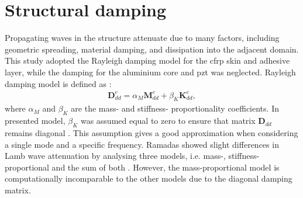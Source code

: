 \section{Structural damping}
\label{sec:damping}

Propagating waves in the structure attenuate due to many factors, including geometric spreading, material damping, and dissipation into the adjacent domain.
This study adopted the Rayleigh damping model for the \ac{cfrp} skin and adhesive layer, while the damping for the aluminium core and \ac{pzt} was neglected.
Rayleigh damping model is defined as \cite{wandowski2017guided}:
\begin{eqnarray}
	\textbf{D}_{dd}^e = \alpha_M \textbf{M}_{dd}^e + \beta_K \textbf{K}_{dd}^e,
	\label{eq:damping}
\end{eqnarray}
where \(\alpha_M\) and \(\beta_K\) are the mass- and stiffness- proportionality coefficients.
In presented model, \(\beta_K\) was assumed equal to zero to ensure that matrix \(\textbf{D}_{dd}\) remains diagonal \cite{schulte2011simulation, wandowski2017guided}.
This assumption gives a good approximation when considering a single mode and a specific frequency. 
Ramadas showed slight differences in Lamb wave attenuation by analysing three models, i.e. mass-, stiffness-proportional and the sum of both \cite{ramadas2011modelling}.
However, the mass-proportional model is computationally incomparable to the other models due to the diagonal damping matrix.